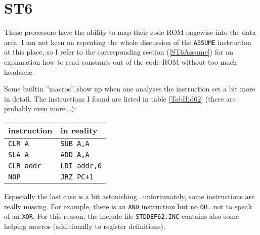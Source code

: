 \documentclass[12pt,twoside]{report}
\newcommand{\tty}[1]{{\tt #1}}
\begin{document}

\section{ST6}

These processors have the ability to map their code ROM pagewise into the
data area.  I am not keen on repeating the whole discussion of the
\tty{ASSUME} instruction at this place, so I refer to the corresponding
section (\ref{ST6Assume}) for an explanation how to read constants out of
the code ROM without too much headache.

Some builtin ''macros'' show up when one analyzes the instruction set a
bit more in detail.  The instructions I found are listed in table
\ref{TabHid62} (there are probably even more...):
\par
\begin{table*}[htbp]
\begin{center}\begin{tabular}{|l|l|}
\hline
instruction & in reality \\
\hline
\hline
\tty{CLR A}      & \tty{SUB A,A} \\
\tty{SLA A}      & \tty{ADD A,A} \\
\tty{CLR addr}   & \tty{LDI addr,0} \\
\tty{NOP}        & \tty{JRZ PC+1} \\
\hline
\end{tabular}\end{center}                                   
\caption{Hidden Macros in the ST62's Instruction Set\label{TabHid62}}
\end{table*}
Especially the last case is a bit astonishing...unfortunately, some
instructions are really missing.  For example, there is an \tty{AND}
instruction but no \tty{OR}...not to speak of an \tty{XOR}.  For this reason, the
include file \tty{STDDEF62.INC} contains also some helping macros
(additionally to register definitions).
\end{document}
